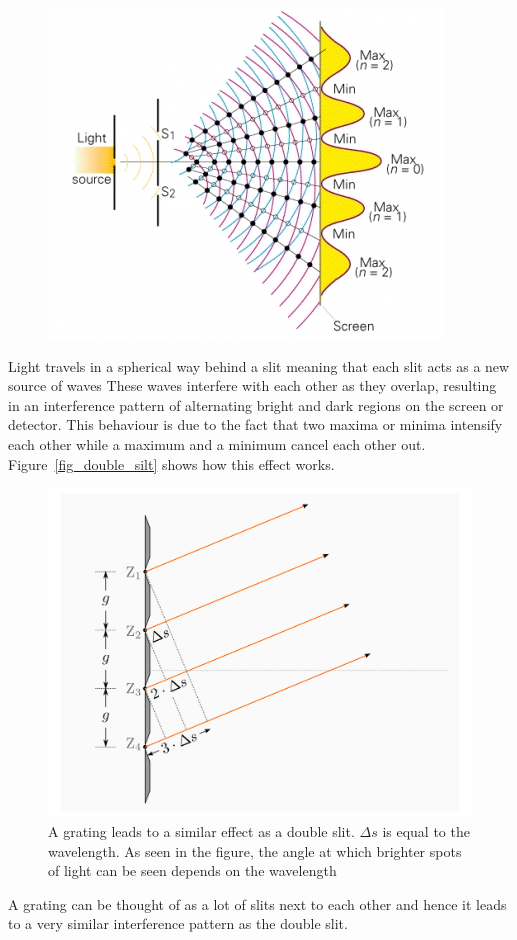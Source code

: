     

    \begin{figure}[H]
        \centering
        \includegraphics[]{src/images/interference_double_slit.jpg}
        \caption{}
        \label{fig_double_slit}
    \end{figure}

    Light travels in a spherical way behind a slit meaning that each slit acts as a new source of waves
    These waves interfere with each other as they overlap, resulting in an interference pattern of alternating bright and dark regions on the screen or detector.
    This behaviour is due to the fact that two maxima or minima intensify each other while a maximum and a minimum cancel each other out.
    Figure~\ref{fig_double_silt} shows how this effect works.

    \begin{figure}[H]
        \centering
        \includegraphics[scale = 0.3]{src/images/interference_grating.png}
        \caption{A grating leads to a similar effect as a double slit.
        $\Delta s$ is equal to the wavelength.
        As seen in the figure, the angle at which brighter spots of light can be seen depends on the wavelength}
        \label{fig_grating}
    \end{figure}
    A grating can be thought of as a lot of slits next to each other and hence it leads to a very similar interference pattern as the double slit.


